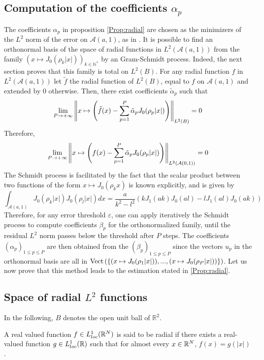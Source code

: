 \documentclass[11pt,a4paper]{article}
\begin{document}
\subsection{Computation of the coefficients $\alpha_p$}
\label{GramShmidtDescription}
The coefficients $\alpha_p$ in proposition \ref{Prop:radial} are chosen as the minimizers of the $L^2$ norm of the error on $\mathcal{A}(a,1)$, as in \cite{Alouges2015}. 
It is possible to find an orthonormal basis of the space of radial functions in $L^2(\mathcal{A}(a,1))$ from the family $\left(x \mapsto J_0(\rho_k |x|)\right)_{k \in \mathbb{N^*}}$ by an Gram-Schmidt process. Indeed, the next section proves that this family is total on $L^2(B)$. For any radial function $f$ in $L^2(\mathcal{A}(a,1))$ let $\tilde{f}$ the radial function of $L^2(B)$, equal to $f$ on $\mathcal{A}(a,1)$ and extended by $0$ otherwise. Then, there exist coefficients $\tilde{\alpha}_p$ such that 
\[\lim_{P\to+\infty} \left\|x\mapsto \left(\tilde{f}(x) - \sum_{p=1}^P\tilde{\alpha}_p J_0(\rho_p|x|)\right)\right\|_{L^2(B)} = 0 \]
Therefore, 
\[\lim_{P\to+\infty} \left\|x\mapsto \left(f(x) - \sum_{p=1}^P\tilde{\alpha}_p J_0(\rho_p|x|)\right)\right\|_{L^2(\mathcal{A}(0,1))} = 0 \]
The Schmidt process is facilitated by the fact that the scalar product between two functions of the form $x \mapsto J_0(\rho_kx)$ is known explicitly, and is given by 
\[ \int_{\mathcal{A}(a,1)}J_0(\rho_k|x|)J_0(\rho_l|x|)dx = \dfrac{a}{k^2-l^2}\left( k J_1(ak) J_0(al) - l J_1(al) J_0(ak)\right)\] 
Therefore, for any error threshold $\varepsilon$, one can apply iteratively the Schmidt process to compute coefficients $\beta_p$ for the orthonormalized family, until the residual $L^2$ norm passes below the threshold after $P$ steps. The coefficients $(\alpha_p)_{1\leq p\leq P}$ are then obtained from the $(\beta_p)_{1\leq p\leq P}$ since the vectors $u_p$ in the orthonormal basis are all in $\textup{Vect}\left(\lbrace(x\mapsto J_0(\rho_1|x|)),...,(x\mapsto J_0(\rho_P|x|))\rbrace \right)$. 
Let us now prove that this method leads to the estimation stated in \ref{Prop:radial}.  

\subsection{Space of radial $L^2$ functions}
In the following, $B$ denotes the open unit ball of $\mathbb{R}^2$. 

\begin{Def} A real valued function $f \in L^1_{loc}(\mathbb{R}^N)$ is said to be radial if there exists a real-valued function $g \in L^1_{loc}(\mathbb{R})$ such that for almost every $x\in \mathbb{R}^N$, $f(x) = g(|x|)$.  
\end{Def}
\end{document}

